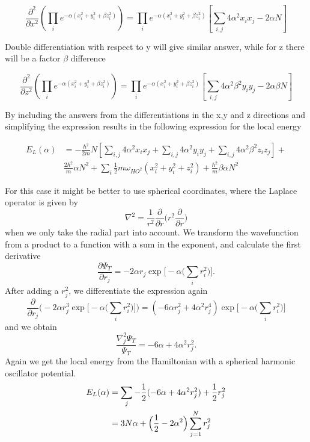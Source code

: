 \documentclass[norsk,a4paper,12pt]{article}
\begin{document}
\begin{equation}
	\frac{\partial^2}{\partial x^2} (\prod_i e^{-\alpha(x_i^2 + y_i^2 + \beta z_i^2)}) = \prod_i e^{-\alpha(x_i^2 + y_i^2 + \beta z_i^2)} [\sum_{i,j} 4 \alpha^2 x_i x_j -2 \alpha N ]
\end{equation}

Double differentiation with respect to y will give similar answer, while for z there will be a factor $\beta$ difference

\begin{equation}
\frac{\partial^2}{\partial z^2} (\prod_i e^{-\alpha(x_i^2 + y_i^2 + \beta z_i^2)}) = \prod_i e^{-\alpha(x_i^2 + y_i^2 + \beta z_i^2)} [\sum_{i,j} 4 \alpha^2 \beta^2 y_i y_j -2 \alpha \beta N ]
\end{equation}

By including the answers from the differentiations in the x,y and z directions and simplifying the expression results in the following expression for the local energy

\begin{equation}
\begin{aligned}
	E_L(\alpha) & = -\frac{\hbar^2}{2m} N [ \sum_{i,j} 4 \alpha^2 x_i x_j + \sum_{i,j} 4 \alpha^2 y_i y_j + \sum_{i,j} 4 \alpha^2 \beta^2 z_i z_j] +  \\ & \frac{2 \hbar^2}{m}\alpha N^2 + \sum_i \frac{1}{2}m\omega_{HO^2}(x_i^2 + y_i^2 + z_i^2) + \frac{\hbar^2}{m}\beta \alpha N^2
\end{aligned}
\end{equation}
\fi


For this case it might be better to use spherical coordinates, where the Laplace operator is given by
\begin{equation}
\nabla^2=\frac{1}{r^2}\frac{\partial}{\partial r}\bigg(r^2\frac{\partial}{\partial r}\bigg)
\end{equation}
when we only take the radial part into account. We transform the wavefunction from a product to a function with a sum in the exponent, and calculate the first derivative
\begin{equation}
\frac{\partial\Psi_T}{\partial r_j}=-2\alpha r_j \exp\bigg[-\alpha\bigg(\sum_i r_i^2\bigg)\bigg].
\end{equation}
After adding a $r_j^2$, we differentiate the expression again
\begin{equation*}
\frac{\partial}{\partial r_j}\bigg(-2\alpha r_j^3\exp\Big[-\alpha\Big(\sum_i r_i^2\Big)\Big]\bigg)
=(-6\alpha r_j^2 + 4\alpha^2r_j^4)\exp\Big[-\alpha\Big(\sum_i r_i^2\Big)\Big]
\end{equation*}
and we obtain
\begin{equation}
\frac{\nabla_j^2\Psi_T}{\Psi_T}=-6\alpha+4\alpha^2r_j^2.
\end{equation}
Again we get the local energy from the Hamiltonian with a spherical harmonic oscillator potential. 
\begin{align}
E_L(\alpha)&=\sum_j-\frac{1}{2}(-6\alpha+4\alpha^2r_j^2) + \frac{1}{2}r_j^2\notag\\
&=3N\alpha + \Big(\frac{1}{2}-2\alpha^2\Big)\sum_{j=1}^Nr_j^2
\end{align}
\end{document}
